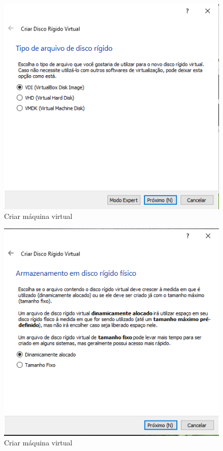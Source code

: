 \documentclass{report}
\begin{document}
\begin{figure}
\centering
\includegraphics[width=\textwidth]{Screenshot_5.png}
\caption{Criar máquina virtual}
\label{fig:5}
\end{figure}

\begin{figure}
\centering
\includegraphics[width=\textwidth]{Screenshot_6.png}
\caption{Criar máquina virtual}
\label{fig:6}
\end{figure}
\end{document}
